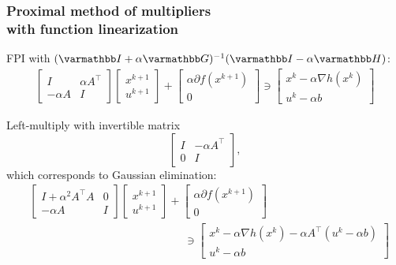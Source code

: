 \documentclass[10pt,mathserif]{beamer}
\begin{document}
\begin{frame}
\frametitle{Proximal method of multipliers\\ with function linearization}
FPI with $(\opI+\alpha \opG)^{-1}(\opI-\alpha \opH)$:
\begin{align*}
  \begin{bmatrix}
    I & \alpha A^\intercal  \\
    -\alpha A & I
  \end{bmatrix}
  \begin{bmatrix}
        x^{k+1} \\
         u ^{k+1}
  \end{bmatrix}
  +
  \begin{bmatrix}
  \alpha \partial f(x^{k+1})\\
  0
  \end{bmatrix}
  \ni
  \begin{bmatrix}
  x^k-\alpha \nabla h(x^k)\\
   u ^k-\alpha b
  \end{bmatrix}
\end{align*}
\vspace{0.2in}

Left-multiply with invertible matrix
\[
\begin{bmatrix}
I&-\alpha  A^\intercal\\
0&I
\end{bmatrix},
\]
which corresponds to Gaussian elimination:
\begin{align*}
  &\begin{bmatrix}
    I+\alpha^2 A^\intercal A & 0  \\
    -\alpha A & I
  \end{bmatrix}
  \begin{bmatrix}
        x^{k+1} \\
         u ^{k+1}
  \end{bmatrix}
  +
  \begin{bmatrix}
  \alpha \partial f(x^{k+1})\\
  0
  \end{bmatrix}\\
  &\qquad\qquad\qquad\qquad\qquad\qquad\qquad\ni
  \begin{bmatrix}
  x^k-\alpha  \nabla  h(x^k)-\alpha A^\intercal( u ^k-\alpha  b)\\
   u ^k-\alpha b
  \end{bmatrix}
  \end{align*}
\end{frame}
\end{document}
